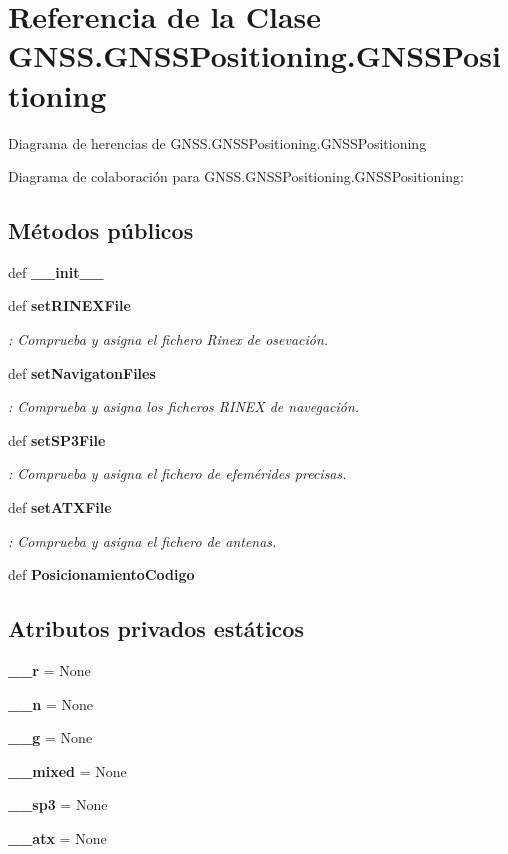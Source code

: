 \section{Referencia de la Clase G\-N\-S\-S.\-G\-N\-S\-S\-Positioning.\-G\-N\-S\-S\-Positioning}
\label{classGNSS_1_1GNSSPositioning_1_1GNSSPositioning}


Diagrama de herencias de G\-N\-S\-S.\-G\-N\-S\-S\-Positioning.\-G\-N\-S\-S\-Positioning


Diagrama de colaboración para G\-N\-S\-S.\-G\-N\-S\-S\-Positioning.\-G\-N\-S\-S\-Positioning\-:
\subsection*{Métodos públicos}
\begin{DoxyCompactItemize}
\item 
def {\bf \-\_\-\-\_\-init\-\_\-\-\_\-}
\item 
def {\bf set\-R\-I\-N\-E\-X\-File}
\begin{DoxyCompactList}\small\item\em \-: Comprueba y asigna el fichero Rinex de osevación. \end{DoxyCompactList}\item 
def {\bf set\-Navigaton\-Files}
\begin{DoxyCompactList}\small\item\em \-: Comprueba y asigna los ficheros R\-I\-N\-E\-X de navegación. \end{DoxyCompactList}\item 
def {\bf set\-S\-P3\-File}
\begin{DoxyCompactList}\small\item\em \-: Comprueba y asigna el fichero de efemérides precisas. \end{DoxyCompactList}\item 
def {\bf set\-A\-T\-X\-File}
\begin{DoxyCompactList}\small\item\em \-: Comprueba y asigna el fichero de antenas. \end{DoxyCompactList}\item 
def {\bf Posicionamiento\-Codigo}
\end{DoxyCompactItemize}
\subsection*{Atributos privados estáticos}
\begin{DoxyCompactItemize}
\item 
{\bf \-\_\-\-\_\-r} = None
\item 
{\bf \-\_\-\-\_\-n} = None
\item 
{\bf \-\_\-\-\_\-g} = None
\item 
{\bf \-\_\-\-\_\-mixed} = None
\item 
{\bf \-\_\-\-\_\-sp3} = None
\item 
{\bf \-\_\-\-\_\-atx} = None
\end{DoxyCompactItemize}


